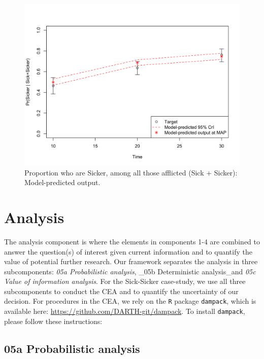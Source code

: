 \documentclass[]{book}
\begin{document}
\begin{figure}

{\centering \includegraphics[width=1\linewidth]{../figs/04_posterior_vs_targets_proportion_sicker} 

}

\caption{Proportion who are Sicker, among all those afflicted (Sick + Sicker): Model-predicted output.}\label{fig:04-proportion}
\end{figure}

\hypertarget{analysis}{%
\chapter{Analysis}\label{analysis}}

The analysis component is where the elements in components 1-4 are combined to answer the question(s) of interest given current information and to quantify the value of potential further research. Our framework separates the analysis in three subcomponents: \emph{05a Probabilistic analysis}, \_05b Deterministic analysis\_and \emph{05c Value of information analysis}. For the Sick-Sicker case-study, we use all three subcomponents to conduct the CEA and to quantify the uncertainty of our decision. For procedures in the CEA, we rely on the \texttt{R} package \texttt{dampack}, which is available here: \url{https://github.com/DARTH-git/dampack}. To install \texttt{dampack}, please follow these instructions:

\hypertarget{Probabilistic-analysis}{%
\section{05a Probabilistic analysis}\label{Probabilistic-analysis}}
\end{document}
